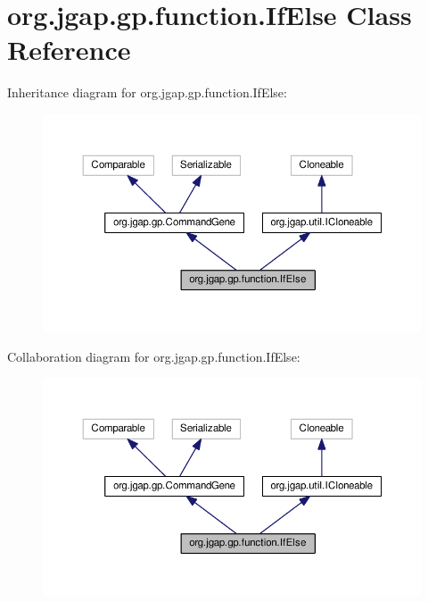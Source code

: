 \hypertarget{classorg_1_1jgap_1_1gp_1_1function_1_1_if_else}{\section{org.\-jgap.\-gp.\-function.\-If\-Else Class Reference}
\label{classorg_1_1jgap_1_1gp_1_1function_1_1_if_else}
}


Inheritance diagram for org.\-jgap.\-gp.\-function.\-If\-Else\-:
\nopagebreak
\begin{figure}[H]
\begin{center}
\leavevmode
\includegraphics[width=350pt]{classorg_1_1jgap_1_1gp_1_1function_1_1_if_else__inherit__graph}
\end{center}
\end{figure}


Collaboration diagram for org.\-jgap.\-gp.\-function.\-If\-Else\-:
\nopagebreak
\begin{figure}[H]
\begin{center}
\leavevmode
\includegraphics[width=350pt]{classorg_1_1jgap_1_1gp_1_1function_1_1_if_else__coll__graph}
\end{center}
\end{figure}
